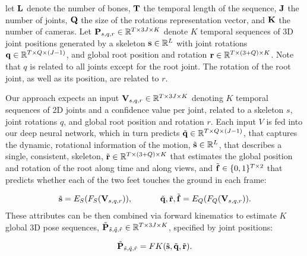 %
 let ${\bf L}$ denote the number of bones, ${\bf T}$ the temporal length of the sequence, ${\bf J}$ the number of joints, ${\bf Q}$ the size of the rotations representation vector, and ${\bf K}$ the number of cameras.
%
Let ${\bf P}_{s,q,r}\in
\mathbb{R}
^{T\times 3J\times K}$ 
denote $K$ temporal sequences of 3D joint positions generated by a skeleton ${\bf s}\in\mathbb{R}^L$ with joint rotations ${\bf q}\in\mathbb{R}^{T\times Q\times(J-1)}$, and global root position and rotation ${\bf r}\in\mathbb{R}^{T\times (3+Q)\times K}$. Note that $q$ is related to all joints except for the root joint. The rotation of the root joint, as well as its position, are related to $r$. 

Our approach expects an input ${\bf V}_{s,q,r}\in\mathbb{R}^{T\times 3J\times K}$ denoting $K$ temporal sequences of 2D joints and a confidence value per joint, 
related to a skeleton $s$, joint rotations $q$, and global root position and rotation $r$. 
Each input $V$ is fed into our deep neural network, which in turn predicts $\tilde{{\bf q}}\in\mathbb{R}^{T\times Q\times(J-1)}$, that captures the dynamic, rotational information of the motion, $\tilde{{\bf s}}\in\mathbb{R}^L$, that describes a single, consistent, skeleton, $\tilde{{\bf r}}\in\mathbb{R}^{T\times (3+Q)\times K}$ that estimates the global position and rotation of the root along time and along views, and $\tilde{{\bf f}}\in\{0,1\}^{T\times 2}$ that predicts whether each of the two feet touches the ground in each frame:

\setlength{\abovedisplayskip}{-5pt plus 2pt minus 2pt}
\setlength{\belowdisplayskip}{5pt plus 2pt minus 2pt}

\begin{align}
\tilde{{\bf s}} = E_S(F_S({\bf V}_{s,q,r})) ,  ~~~~~~~~~~
\tilde{{\bf q}},\tilde{{\bf r}},\tilde{{\bf f}} = E_Q(F_Q({\bf V}_{s,q,r})).
\end{align}
These attributes can be then combined via forward kinematics to estimate $K$ global 3D pose sequences, $\tilde{{\bf P}}_{\tilde{s},\tilde{q},\tilde{r}}\in\mathbb{R}^{T\times 3J\times K}$, specified by joint positions:

\setlength{\abovedisplayskip}{-5pt plus 2pt minus 2pt}
\setlength{\belowdisplayskip}{5pt plus 2pt minus 2pt}

\begin{align}
\tilde{{\bf P}}_{\tilde{s},\tilde{q},\tilde{r}}=FK(\tilde{{\bf s}}, \tilde{{\bf q}}, \tilde{{\bf r}}).
\end{align}



